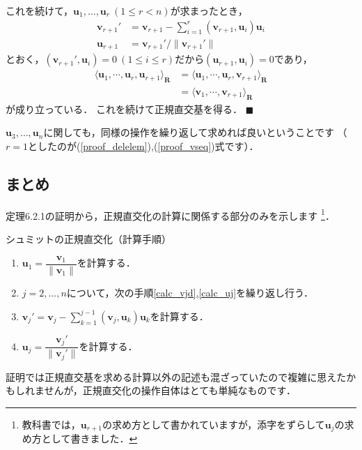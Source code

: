\documentclass[dvipdfmx]{jsarticle}
\theoremstyle{definition}
\begin{document}
\begin{leftbar}
    これを続けて，$\bm{u}_1, \ldots, \bm{u}_r \ (1 \leq r < n)$が求まったとき，
    \begin{align*}
        \bm{v}_{r+1}' &= \bm{v}_{r+1} - \sum_{i=1}^r (\bm{v}_{r+1}, \bm{u}_i) \bm{u}_i \\
        \bm{u}_{r+1} &= \bm{v}_{r+1}' / \|\bm{v}_{r+1}'\|
    \end{align*}
    とおく，$(\bm{v}_{r+1}', \bm{u}_i) = 0 \ (1 \leq i \leq r)$だから$(\bm{u}_{r+1}, \bm{u}_i) = 0$であり，
    \begin{align*}
        \langle \bm{u}_1, \cdots, \bm{u}_r, \bm{u}_{r+1} \rangle_{\bm{R}}
        &= \langle \bm{u}_1, \cdots, \bm{u}_r, \bm{v}_{r+1} \rangle_{\bm{R}} \\
        &= \langle \bm{v}_1, \cdots, \bm{v}_{r+1} \rangle_{\bm{R}}
    \end{align*}
    が成り立っている．
    これを続けて正規直交基を得る．
    \hfill $\blacksquare$
\end{leftbar}

$\bm{u}_3, \ldots, \bm{u}_n$に関しても，同様の操作を繰り返して求めれば良いということです
（$r = 1$としたのが(\ref{proof_delelem}),(\ref{proof_vseq})式です）．

\subsection{まとめ}
\label{ssec_conc}
定理6.2.1の証明から，正規直交化の計算に関係する部分のみを示します
\footnote{教科書では，$\bm{u}_{r+1}$の求め方として書かれていますが，添字をずらして$\bm{u}_{j}$の求め方として書きました．}．
\begin{itembox}[l]{シュミットの正規直交化（計算手順）}
    \begin{enumerate}
        \item $\bm{u}_1 = \dfrac{\bm{v}_1}{\| \bm{v}_1 \|}$を計算する．  \label{calc_u1}
        \item $j = 2, \ldots, n$について，次の手順\ref{calc_vjd},\ref{calc_uj}を繰り返し行う．
        \item $\bm{v}_j' = \bm{v}_j - {\displaystyle \sum_{k=1}^{j-1}} (\bm{v}_j, \bm{u}_k) \bm{u}_k$を計算する．  \label{calc_vjd}
        \item $\bm{u}_j = \dfrac{\bm{v}_j'}{\| \bm{v}_j' \|}$を計算する．  \label{calc_uj}
    \end{enumerate}
\end{itembox}
証明では正規直交基を求める計算以外の記述も混ざっていたので複雑に思えたかもしれませんが，正規直交化の操作自体はとても単純なものです．
\end{document}
